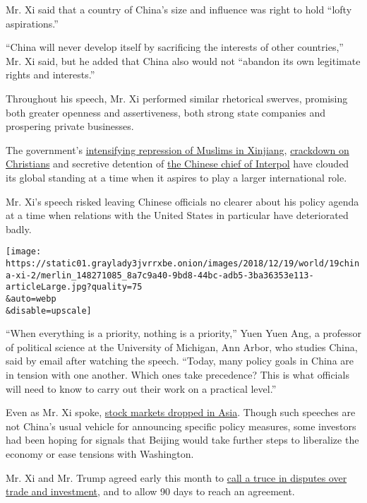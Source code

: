 Mr. Xi said that a country of China's size and influence was right to
hold ``lofty aspirations.''

``China will never develop itself by sacrificing the interests of other
countries,'' Mr. Xi said, but he added that China also would not
``abandon its own legitimate rights and interests.''

Throughout his speech, Mr. Xi performed similar rhetorical swerves,
promising both greater openness and assertiveness, both strong state
companies and prospering private businesses.

The government's
\href{https://www.nytimes3xbfgragh.onion/2018/12/16/world/asia/xinjiang-china-forced-labor-camps-uighurs.html}{intensifying
repression of Muslims in Xinjiang},
\href{https://www.nytimes3xbfgragh.onion/2018/12/13/world/asia/china-religion-crackdown.html}{crackdown
on Christians} and secretive detention of
\href{https://www.nytimes3xbfgragh.onion/2018/10/05/world/europe/meng-hongwei-missing-interpol.html}{the
Chinese chief of Interpol} have clouded its global standing at a time
when it aspires to play a larger international role.

Mr. Xi's speech risked leaving Chinese officials no clearer about his
policy agenda at a time when relations with the United States in
particular have deteriorated badly.

\texttt{[image: https://static01.graylady3jvrrxbe.onion/images/2018/12/19/world/19china-xi-2/merlin\_148271085\_8a7c9a40-9bd8-44bc-adb5-3ba36353e113-articleLarge.jpg?quality=75\\\&auto=webp\\\&disable=upscale]}

``When everything is a priority, nothing is a priority,'' Yuen Yuen Ang,
a professor of political science at the University of Michigan, Ann
Arbor, who studies China, said by email after watching the speech.
``Today, many policy goals in China are in tension with one another.
Which ones take precedence? This is what officials will need to know to
carry out their work on a practical level.''

Even as Mr. Xi spoke,
\href{https://www.nytimes3xbfgragh.onion/2018/12/18/business/stock-markets.html}{stock
markets dropped in Asia}. Though such speeches are not China's usual
vehicle for announcing specific policy measures, some investors had been
hoping for signals that Beijing would take further steps to liberalize
the economy or ease tensions with Washington.

Mr. Xi and Mr. Trump agreed early this month to
\href{https://www.nytimes3xbfgragh.onion/2018/12/01/world/trump-xi-g20-merkel.html}{call
a truce in disputes over trade and investment}, and to allow 90 days to
reach an agreement.


